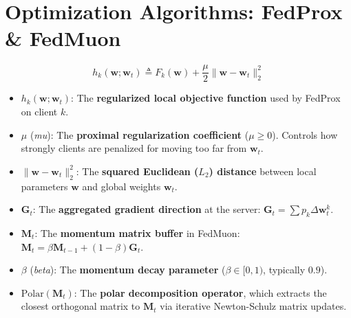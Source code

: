 \documentclass[11pt,a4paper,titlepage]{report}
\begin{document}
\section{Optimization Algorithms: FedProx \& FedMuon}
\begin{equation}
    h_k(\mathbf{w}; \mathbf{w}_t) \triangleq F_k(\mathbf{w}) + \frac{\mu}{2} \|\mathbf{w} - \mathbf{w}_t\|_2^2
\end{equation}
\begin{itemize}[leftmargin=*]
    \item $h_k(\mathbf{w}; \mathbf{w}_t)$: The \textbf{regularized local objective function} used by FedProx on client $k$.
    \item $\mu$ (\textit{mu}): The \textbf{proximal regularization coefficient} ($\mu \ge 0$). Controls how strongly clients are penalized for moving too far from $\mathbf{w}_t$.
    \item $\|\mathbf{w} - \mathbf{w}_t\|_2^2$: The \textbf{squared Euclidean ($L_2$) distance} between local parameters $\mathbf{w}$ and global weights $\mathbf{w}_t$.
    \item $\mathbf{G}_t$: The \textbf{aggregated gradient direction} at the server: $\mathbf{G}_t = \sum p_k \Delta\mathbf{w}_t^k$.
    \item $\mathbf{M}_t$: The \textbf{momentum matrix buffer} in FedMuon: $\mathbf{M}_t = \beta \mathbf{M}_{t-1} + (1 - \beta) \mathbf{G}_t$.
    \item $\beta$ (\textit{beta}): The \textbf{momentum decay parameter} ($\beta \in [0, 1)$, typically $0.9$).
    \item $\text{Polar}(\mathbf{M}_t)$: The \textbf{polar decomposition operator}, which extracts the closest orthogonal matrix to $\mathbf{M}_t$ via iterative Newton-Schulz matrix updates.
\end{itemize}
\end{document}
